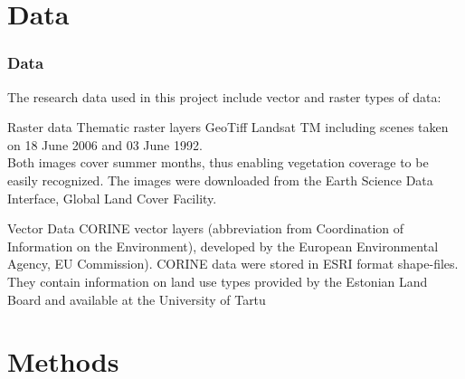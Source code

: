 \documentclass[pdflatex,compress,8pt,
	xcolor={dvipsnames,dvipsnames,svgnames,x11names,table},
	hyperref={	
	breaklinks = true, 
	pdfauthor={Lemenkova Polina}, 
	pdfsubject={Preentation}, 
	pdfcreator={Lemenkova Polina}, 
	pdfproducer={Lemenkova Polina}, 
	colorlinks=true,
	linkcolor=Tomato, 
	citecolor=DeepPink3, 
	urlcolor = NavyBlue, 
	breaklinks = true}]{beamer}
\begin{document}
\section{Data}
\begin{frame}\frametitle{Data}
	The research data used in this project include vector and raster types of data:

	\begin{block}{Raster data}
Thematic raster layers GeoTiff Landsat TM including scenes taken on \alert{18 June 2006} and \alert{03 June 1992}. \\
Both images cover summer months, thus enabling vegetation coverage to be easily recognized. The images were downloaded from the Earth Science Data Interface, Global Land Cover Facility.
	\end{block}

	\begin{block}{Vector Data}
CORINE vector layers (abbreviation from \alert{Coordination of Information on the Environment}), developed by the European Environmental Agency, EU Commission). CORINE data were stored in ESRI format shape-files. They contain information on land use types provided by the Estonian Land Board and available at the University of Tartu
	\end{block}
\end{frame}

\section{Methods}
\end{document}
